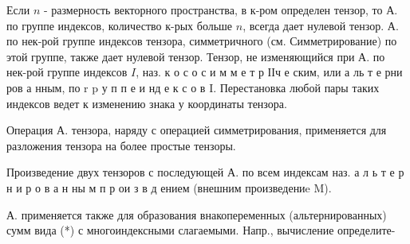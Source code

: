 \documentclass[10pt]{article}
\begin{document}
Если $n$ - размерность векторного пространства, в к-ром определен тензор, то А. по группе индексов, количество к-рых больше $n$, всегда дает нулевой тензор. А. по нек-рой группе индексов тензора, симметричного (см. Симметрирование) по этой группе, также дает нулевой тензор. Тензор, не изменяющийся при А. по нек-рой группе индексов $I$, наз. к о с о с и м м е т р ІІч е ским, или а ль т е рни ров а нным, по r p у п п е и нд е к с о в I. Перестановка любой пары таких индексов ведет к изменению знака у координаты тензора.



Операция А. тензора, наряду с операцией симметрирования, применяется для разложения тензора на более простые тензоры.



Произведение двух тензоров с последующей А. по всем индексам наз. а л ь т е р н и р о в а н ны м п р ои з в д ением (внешним произведениe M).



А. применяется также для образования внакопеременных (альтернированных) сумм вида (*) с многоиндексными слагаемыми. Напр., вычисление определите-
\end{document}
